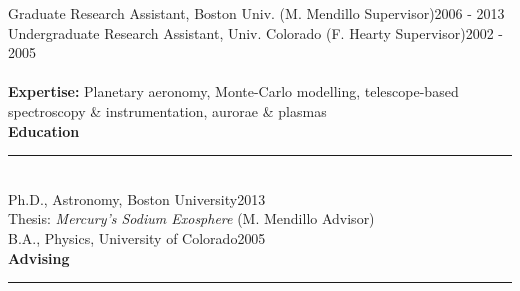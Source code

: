 \documentclass[12pt]{report}
\begin{document}
\noindent Graduate Research Assistant, Boston Univ. (M. Mendillo Supervisor)\hfill 2006 - 2013\\
\noindent Undergraduate Research Assistant, Univ. Colorado (F. Hearty Supervisor)\hfill 2002 - 2005\\
\vspace{1 mm}\\
\textbf{Expertise:} Planetary aeronomy, Monte-Carlo modelling, telescope-based spectroscopy \& instrumentation, aurorae \& plasmas\\

\vspace{2 mm}
\noindent \bf{Education}\rm \hspace*{\fill} \\
\rule{\textwidth}{1pt}\\
\noindent Ph.D., Astronomy, Boston University\hfill 2013\\
\indent Thesis: {\it Mercury's Sodium Exosphere} (M. Mendillo Advisor)\\
\noindent B.A., Physics, University of Colorado\hfill 2005\\

\vspace{2 mm}
\noindent \bf{Advising}\rm \hspace*{\fill} \\
\rule{\textwidth}{1pt}
\end{document}

